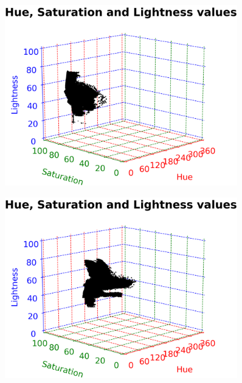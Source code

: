 \vspace{1mm}

\begin{figure}[H]
	\centering
	\begin{minipage}{0.5\textwidth}
		\centering
		\includegraphics[width=0.9\textwidth]{img/hsl3DGreen.png}
		\captionsetup{width=0.9\textwidth}
		\label{hsl3DGreenPlot}
	\end{minipage}%
	\begin{minipage}{0.5\textwidth}
		\centering
		\includegraphics[width=0.9\textwidth]{img/hsl3DBlueGreen.png}
		\captionsetup{width=0.9\textwidth}
		\label{hsl3DBlueGreenPlot}
	\end{minipage}
\end{figure}

